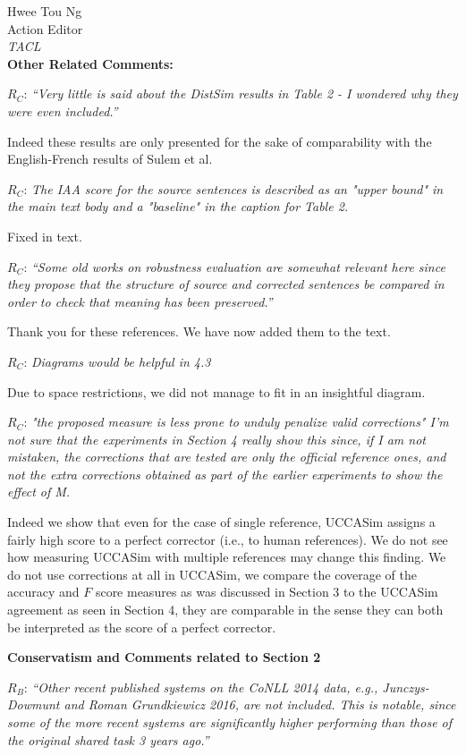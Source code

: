 \documentclass[11pt,letterpaper]{letter}
\begin{document}
\begin{letter}{%
Hwee Tou Ng\\
Action Editor\\
{\em TACL}\\
}
\vspace{.5cm}
{\large\bf Other Related Comments:}
	
$R_C$: \emph{``Very little is said about the DistSim results in Table 2 - I wondered why
	they were even included.''}
	
Indeed these results are only presented for the sake of comparability with the English-French results of Sulem et al.
	
	
$R_C$: \emph{The IAA score for the source sentences is described as an "upper bound" in
	the main text body and a "baseline" in the caption for Table 2.}

Fixed in text.
	
	
$R_C$: \emph{``Some old works on robustness evaluation are somewhat relevant here since
	they propose that the structure of source and corrected sentences be
	compared in order to check that meaning has been preserved.''}
	
Thank you for these references. We have now added them to the text.


	$R_C$: \emph{Diagrams would be helpful in 4.3}
	
	Due to space restrictions, we did not manage to fit in an insightful diagram.
	
	$R_C$: \emph{"the proposed measure is less prone to unduly penalize valid corrections"
I'm not sure that the experiments in Section 4 really show this since, if I
am not mistaken, the corrections that are tested are only the official
reference ones, and not the extra corrections obtained as part of the
earlier experiments to show the effect of M.}

Indeed we show that even for the case of single reference, UCCASim assigns a fairly high score to a perfect corrector (i.e., to human references). We do not see how measuring UCCASim with multiple references may change this finding.
We do not use corrections at all in UCCASim, we compare the coverage of the accuracy and $F$ score measures as was discussed in Section 3 to the UCCASim agreement as seen in Section 4, they are comparable in the sense they can both be interpreted as the score of a perfect corrector. 

{\large\bf Conservatism and Comments related to Section 2}

$R_B$: \emph{``Other recent published systems on the CoNLL 2014 data, e.g., Junczys-Dowmunt
	and Roman Grundkiewicz 2016, are not included. This is notable, since some
	of the more recent systems are significantly higher performing than those of
	the original shared task 3 years ago.''}
	

\end{letter}
\end{document}

